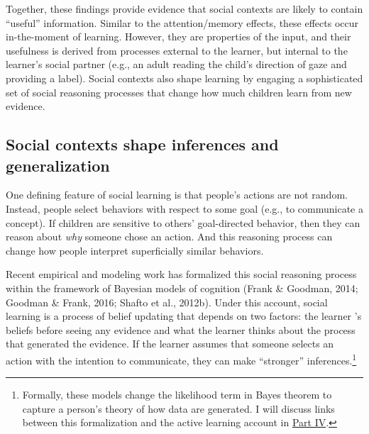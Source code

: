 \documentclass[oneside]{report}
\begin{document}
Together, these findings provide evidence that social contexts are
likely to contain ``useful'' information. Similar to the
attention/memory effects, these effects occur in-the-moment of learning.
However, they are properties of the input, and their usefulness is
derived from processes external to the learner, but internal to the
learner's social partner (e.g., an adult reading the child's direction
of gaze and providing a label). Social contexts also shape learning by
engaging a sophisticated set of social reasoning processes that change
how much children learn from new evidence.

\hypertarget{social-contexts-shape-inferences-and-generalization}{%
\subsection{Social contexts shape inferences and
generalization}\label{social-contexts-shape-inferences-and-generalization}}

One defining feature of social learning is that people's actions are not
random. Instead, people select behaviors with respect to some goal
(e.g., to communicate a concept). If children are sensitive to others'
goal-directed behavior, then they can reason about \emph{why} someone
chose an action. And this reasoning process can change how people
interpret superficially similar behaviors.

Recent empirical and modeling work has formalized this social reasoning
process within the framework of Bayesian models of cognition (Frank \&
Goodman, 2014; Goodman \& Frank, 2016; Shafto et al., 2012b). Under this
account, social learning is a process of belief updating that depends on
two factors: the learner 's beliefs before seeing any evidence and what
the learner thinks about the process that generated the evidence. If the
learner assumes that someone selects an action with the intention to
communicate, they can make ``stronger'' inferences.\footnote{Formally,
  these models change the likelihood term in Bayes theorem to capture a
  person's theory of how data are generated. I will discuss links
  between this formalization and the active learning account in
  \protect\hyperlink{p4}{Part IV}.}
\end{document}
